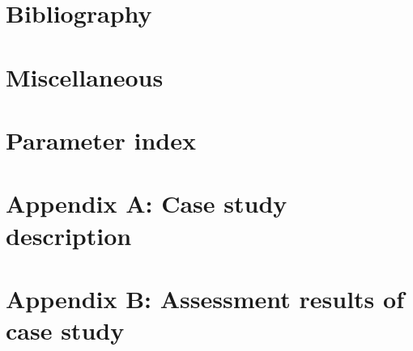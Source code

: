 \documentclass{article}
\begin{document}
\section{Bibliography}

\section{Miscellaneous}
\section{Parameter index}

\section{Appendix A: Case study description}
\label{section:AppendixA}

\section{Appendix B: Assessment results of case study}
\label{section:AppendixB}
\end{document}
